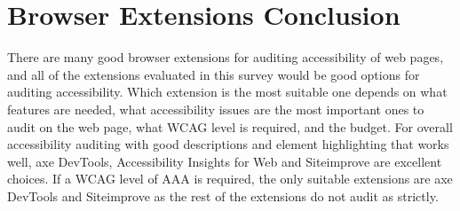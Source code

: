 \section{Browser Extensions Conclusion}
There are many good browser extensions for auditing accessibility of web pages, and all of the extensions evaluated in this survey would be good options for auditing accessibility.
Which extension is the most suitable one depends on what features are needed, what accessibility issues are the most important ones to audit on the web page, what WCAG level is required, and the budget.
For overall accessibility auditing with good descriptions and element highlighting that works well, axe DevTools, Accessibility Insights for Web and Siteimprove are excellent choices.
If a WCAG level of AAA is required, the only suitable extensions are axe DevTools and Siteimprove as the rest of the extensions do not audit as strictly.

